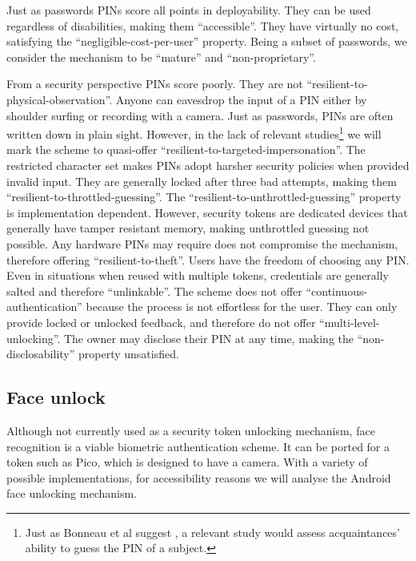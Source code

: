 Just as passwords PINs score all points in deployability. They can be used regardless of disabilities, making them ``accessible''. They have virtually no cost, satisfying the ``negligible-cost-per-user'' property. Being a subset of passwords, we consider the mechanism to be ``mature'' and ``non-proprietary''.
	
From a security perspective PINs score poorly. They are not ``resilient-to-physical-observation''. Anyone can eavesdrop the input of a PIN either by shoulder surfing or recording with a camera. Just as passwords, PINs are often written down in plain sight. However, in the lack of relevant studies\footnote{Just as Bonneau et al suggest \cite{bonneau2012quest}, a relevant study would assess acquaintances' ability to guess the PIN of a subject.} we will mark the scheme to quasi-offer ``resilient-to-targeted-impersonation''. The restricted character set makes PINs adopt harsher security policies when provided invalid input. They are generally locked after three bad attempts, making them ``resilient-to-throttled-guessing''. The ``resilient-to-unthrottled-guessing'' property is implementation dependent. However, security tokens are dedicated devices that generally have tamper resistant memory, making unthrottled guessing not possible. Any hardware PINs may require does not compromise the mechanism, therefore offering ``resilient-to-theft''. Users have the freedom of choosing any PIN. Even in situations when reused with multiple tokens, credentials are generally salted and therefore ``unlinkable''. The scheme does not offer ``continuous-authentication'' because the process is not effortless for the user. They can only provide locked or unlocked feedback, and therefore do not offer ``multi-level-unlocking''. The owner may disclose their PIN at any time, making the ``non-disclosability'' property unsatisfied. 
	
%
%
\subsection{Face unlock}
Although not currently used as a security token unlocking mechanism, face recognition is a viable biometric authentication scheme. It can be ported for a token such as Pico, which is designed to have a camera. With a variety of possible implementations, for accessibility reasons we will analyse the Android face unlocking mechanism.
	
